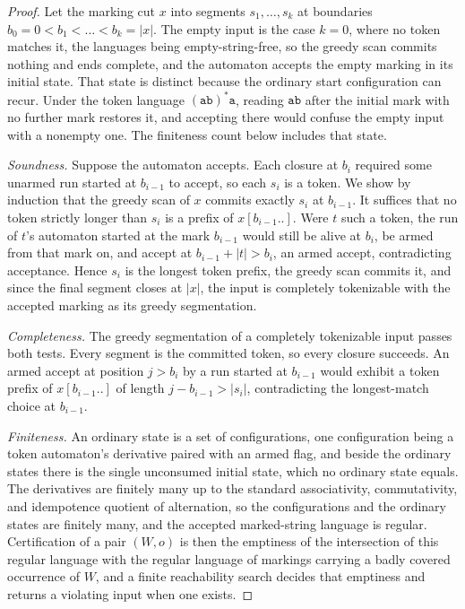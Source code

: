 \documentclass[11pt,a4paper]{article}
\theoremstyle{definition}
\theoremstyle{plain}
\newcommand{\code}[1]{\texttt{#1}}
\begin{document}
\begin{proof}
Let the marking cut $x$ into segments $s_1, \dots, s_k$ at boundaries $b_0 = 0 < b_1 < \dots < b_k = |x|$. The empty
input is the case $k = 0$, where no token matches it, the languages being empty-string-free, so the greedy scan commits
nothing and ends complete, and the automaton accepts the empty marking in its initial state. That state is distinct
because the ordinary start configuration can recur. Under the token language $(\code{ab})^{*}\code{a}$, reading
$\code{ab}$ after the initial mark with no further mark restores it, and accepting there would confuse the empty input
with a nonempty one. The finiteness count below includes that state.

\emph{Soundness.} Suppose the automaton accepts. Each closure at $b_i$ required some unarmed run started at $b_{i-1}$ to
accept, so each $s_i$ is a token. We show by induction that the greedy scan of $x$ commits exactly $s_i$ at $b_{i-1}$.
It suffices that no token strictly longer than $s_i$ is a prefix of $x[b_{i-1}..]$. Were $t$ such a token, the run of
$t$'s automaton started at the mark $b_{i-1}$ would still be alive at $b_i$, be armed from that mark on, and accept at
$b_{i-1} + |t| > b_i$, an armed accept, contradicting acceptance. Hence $s_i$ is the longest token prefix, the greedy
scan commits it, and since the final segment closes at $|x|$, the input is completely tokenizable with the accepted
marking as its greedy segmentation.

\emph{Completeness.} The greedy segmentation of a completely tokenizable input passes both tests. Every segment is the
committed token, so every closure succeeds. An armed accept at position $j > b_i$ by a run started at $b_{i-1}$ would
exhibit a token prefix of $x[b_{i-1}..]$ of length $j - b_{i-1} > |s_i|$, contradicting the longest-match choice at
$b_{i-1}$.

\emph{Finiteness.} An ordinary state is a set of configurations, one configuration being a token automaton's derivative
paired with an armed flag, and beside the ordinary states there is the single unconsumed initial state, which no
ordinary state equals. The derivatives are finitely many up to the standard associativity, commutativity, and
idempotence quotient of alternation, so the configurations and the ordinary states are finitely many, and the accepted
marked-string language is regular. Certification of a pair $(W, o)$ is then the emptiness of the intersection of this
regular language with the regular language of markings carrying a badly covered occurrence of $W$, and a finite
reachability search decides that emptiness and returns a violating input when one exists.
\end{proof}
\end{document}
